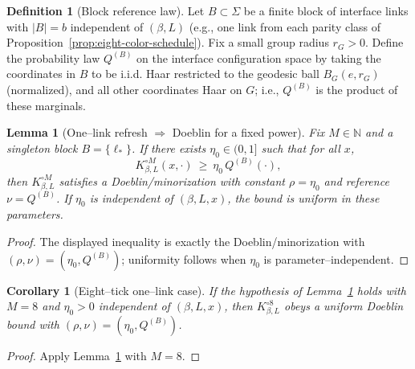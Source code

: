 \documentclass[11pt]{amsart}
\theoremstyle{plain}
\newtheorem{lemma}[theorem]{Lemma}
\newtheorem{corollary}[theorem]{Corollary}
\theoremstyle{definition}
\newtheorem{definition}[theorem]{Definition}
\theoremstyle{remark}
\begin{document}
\begin{definition}[Block reference law]\label{def:block-reference}
Let $B\subset \Sigma$ be a finite block of interface links with $|B|=b$ independent of $(\beta,L)$ (e.g., one link from each parity class of Proposition~\ref{prop:eight-color-schedule}). Fix a small group radius $r_G>0$. Define the probability law $Q^{(B)}$ on the interface configuration space by taking the coordinates in $B$ to be i.i.d. Haar restricted to the geodesic ball $B_G(e,r_G)$ (normalized), and all other coordinates Haar on $G$; i.e., $Q^{(B)}$ is the product of these marginals.
\end{definition}

\begin{lemma}[One--link refresh $\Rightarrow$ Doeblin for a fixed power]\label{lem:one-link-doeblin}
Fix $M\in\mathbb N$ and a singleton block $B=\{\ell_*\}$. If there exists $\eta_0\in(0,1]$ such that for all $x$,
\[
  K_{\beta,L}^{\circ M}(x,\cdot)\ \ge\ \eta_0\, Q^{(B)}(\cdot),
\]
then $K_{\beta,L}^{\circ M}$ satisfies a Doeblin/minorization with constant $\rho=\eta_0$ and reference $\nu=Q^{(B)}$. If $\eta_0$ is independent of $(\beta,L,x)$, the bound is uniform in these parameters.
\end{lemma}
\begin{proof}
The displayed inequality is exactly the Doeblin/minorization with $(\rho,\nu)=(\eta_0, Q^{(B)})$; uniformity follows when $\eta_0$ is parameter--independent.
\end{proof}

\begin{corollary}[Eight--tick one--link case]\label{cor:8tick-one-link}
If the hypothesis of Lemma~\ref{lem:one-link-doeblin} holds with $M=8$ and $\eta_0>0$ independent of $(\beta,L,x)$, then $K_{\beta,L}^{\circ 8}$ obeys a uniform Doeblin bound with $(\rho,\nu)=(\eta_0, Q^{(B)})$.
\end{corollary}
\begin{proof}
Apply Lemma~\ref{lem:one-link-doeblin} with $M=8$.
\end{proof}
\end{document}
